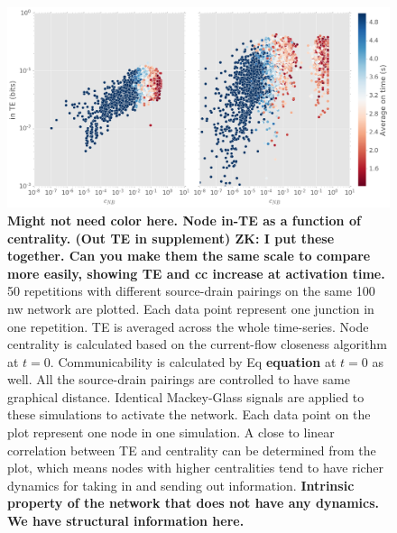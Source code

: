 \documentclass[fleqn,10pt,  reprint, amsmath,amssymb,aps, floatfix]{wlscirep}
\begin{document}
\begin{figure}[h]
	\centering
	\includegraphics[width=0.9\linewidth]{figure/TE_combined}
	\caption{\textbf{Might not need color here. Node in-TE as a function of centrality. (Out TE in  supplement) ZK: I put these together. Can you make them the same scale to compare more easily, showing TE and cc increase at activation time.} 50 repetitions with different source-drain pairings on the same 100 nw network are plotted. Each data point represent one junction in one repetition. TE is averaged across the whole time-series. Node centrality is calculated based on the current-flow closeness algorithm at $t = 0$. Communicability is calculated by Eq \textbf{equation} at $t = 0$ as well. All the source-drain pairings are controlled to have same graphical distance. Identical Mackey-Glass signals are applied to these simulations to activate the network. Each data point on the plot represent one node in one simulation. A close to linear correlation between TE and centrality can be determined from the plot, which means nodes with higher centralities tend to have richer dynamics for taking in and sending out information.
	\textbf{Intrinsic property of the network that does not have any dynamics. We have structural information here.}}
	\label{fig:TE_combined}
\end{figure}

\end{document}

